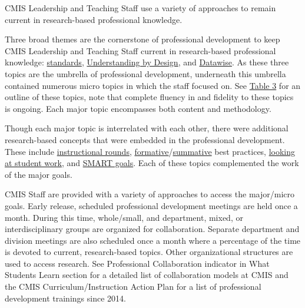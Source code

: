\begin{findings}
CMIS Leadership and Teaching Staff use a variety of approaches to remain current in research-based professional knowledge.


Three broad themes are the cornerstone of professional development to keep CMIS Leadership and Teaching Staff current in research-based professional knowledge: \href{https://drive.google.com/drive/folders/0B71_pYxcTLo-NGJ4N0RQWXRTNE0?usp=sharing}{standards}, \href{https://docs.google.com/a/cmis.ac.th/document/d/1kL1VjwfuMMa7NaWmwUrEah1BM-jJRmLAd4VJzR3HoPs/edit?usp=sharing}{Understanding by Design}, and \href{https://docs.google.com/a/cmis.ac.th/presentation/d/1omzyjfwf5fazGCSuvw7dDQn4eqhpOIaldeLXY7-6PYQ/edit?usp=sharing}{Datawise}. As these three topics are the umbrella of professional development, underneath this umbrella contained numerous micro topics in which the staff focused on. See \href{https://docs.google.com/a/cmis.ac.th/document/d/1Xi1oHSwcvMUAaFtHW9SU3m1QJpIRRrmdphVHokoJsI8/edit?usp=sharing}{Table 3} for an outline of these topics, note that complete fluency in and fidelity to these topics is ongoing. Each major topic encompasses both content and methodology. 

Though each major topic is interrelated with each other, there were additional research-based concepts that were embedded in the professional development. These include \href{https://drive.google.com/drive/folders/0ByVFfrm0zfolQ3FRNWNSVmpCUUk?usp=sharing}{instructional rounds}, \href{https://drive.google.com/drive/folders/0ByVFfrm0zfolaFNZMDVFZnFLazA?usp=sharing}{formative}/\href{https://drive.google.com/drive/folders/0ByVFfrm0zfolczUtZFkzUldXQnM?usp=sharing}{summative} best practices, \href{https://drive.google.com/drive/folders/0ByVFfrm0zfolWW5aWGZOUjVJTm8?usp=sharing}{looking at student work}, and \href{https://drive.google.com/drive/folders/0ByVFfrm0zfolWFNfWGRuWDlxUDQ?usp=sharing}{SMART goals}. Each of these topics complemented the work of the major goals. 

CMIS Staff are provided with a variety of approaches to access the major/micro goals. Early release, scheduled professional development meetings are held once a month. During this time, whole/small, and department, mixed, or interdisciplinary groups are organized for collaboration. Separate department and division meetings are also scheduled once a month where a percentage of the time is devoted to current, research-based topics. Other organizational structures are used to access research. See Professional Collaboration indicator in What Students Learn section for a detailed list of collaboration models at CMIS and the CMIS Curriculum/Instruction Action Plan for a list of professional development trainings since 2014. 
 

\end{findings}
